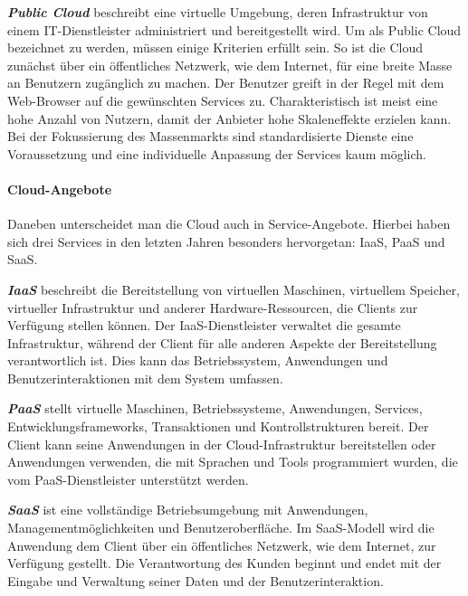 \textit{\textbf{Public Cloud}} beschreibt eine virtuelle Umgebung, deren Infrastruktur von einem \ac{IT}-Dienstleister administriert und bereitgestellt wird. Um als Public Cloud bezeichnet zu werden, müssen einige Kriterien erfüllt sein. So ist die Cloud zunächst über ein öffentliches Netzwerk, wie dem Internet, für eine breite Masse an Benutzern zugänglich zu machen. Der Benutzer greift in der Regel mit dem Web-Browser auf die gewünschten Services zu. Charakteristisch ist meist eine hohe Anzahl von Nutzern, damit der Anbieter hohe Skaleneffekte erzielen kann. Bei der Fokussierung des Massenmarkts sind standardisierte Dienste eine Voraussetzung und eine individuelle Anpassung der Services kaum möglich. 
\autocite{Labes.2012}

\paragraph{Cloud-Angebote}

Daneben unterscheidet man die Cloud auch in Service-Angebote. Hierbei haben sich drei Services in
den letzten Jahren besonders hervorgetan: \acf{IaaS}, \acf{PaaS} und \acf{SaaS}. 

\textit{\textbf{\acl{IaaS}}} beschreibt die Bereitstellung von virtuellen Maschinen, virtuellem Speicher, virtueller Infrastruktur und anderer Hardware-Ressourcen, die Clients zur Verfügung stellen können. Der \ac{IaaS}-Dienstleister verwaltet die gesamte Infrastruktur, während der Client für alle anderen Aspekte der Bereitstellung verantwortlich ist. Dies kann das Betriebssystem, Anwendungen und Benutzerinteraktionen mit dem System umfassen.

\textit{\textbf{\acl{PaaS}}} stellt virtuelle Maschinen, Betriebssysteme, Anwendungen, Services, Entwicklungsframeworks, Transaktionen und Kontrollstrukturen bereit. Der Client kann seine Anwendungen in der Cloud-Infrastruktur bereitstellen oder Anwendungen verwenden, die mit Sprachen und Tools programmiert wurden, die vom \ac{PaaS}-Dienstleister unterstützt werden.

\textit{\textbf{\acl{SaaS}}} ist eine vollständige Betriebsumgebung mit Anwendungen, Managementmöglichkeiten und Benutzeroberfläche. Im \ac{SaaS}-Modell wird die Anwendung dem Client über ein öffentliches Netzwerk, wie dem Internet, zur Verfügung gestellt. Die Verantwortung des Kunden beginnt und endet mit der Eingabe und Verwaltung seiner Daten und der Benutzerinteraktion.
\autocite{Sosinsky.2011}

